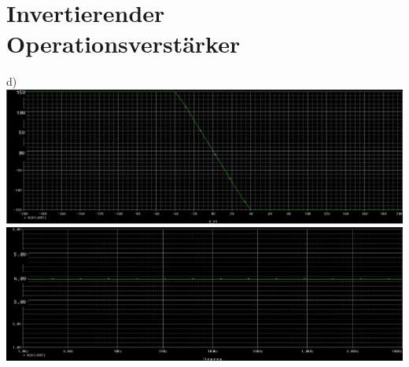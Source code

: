 \documentclass[a4paper]{article}
\begin{document}
\section*{Invertierender Operationsverst\"arker}
d)\\
\includegraphics[scale=0.4]{SimulationInverter_d}
\\[0.5cm]
\includegraphics[scale=0.4]{SimulationInverterAC_d}
\newpage
\end{document}
